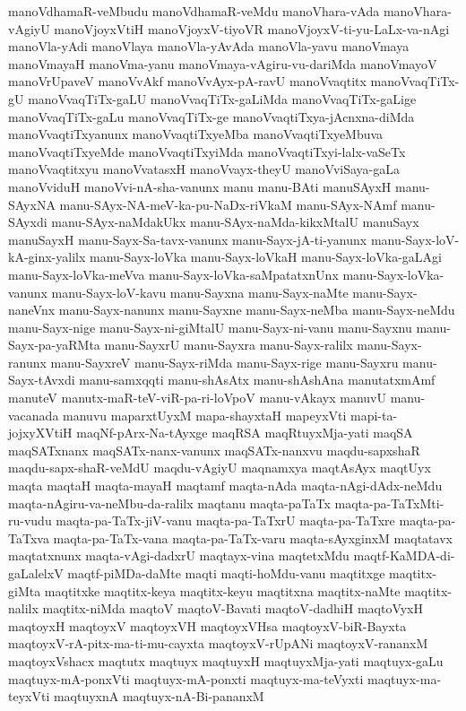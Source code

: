 {manoVdhamaR-veMbudu
manoVdhamaR-veMdu
manoVhara-vAda
manoVhara-vAgiyU
manoVjoyxVtiH
manoVjoyxV-tiyoVR
manoVjoyxV-ti-yu-LaLx-va-nAgi
manoVla-yAdi
manoVlaya
manoVla-yAvAda
manoVla-yavu
manoVmaya
manoVmayaH
manoVma-yanu
manoVmaya-vAgiru-vu-dariMda
manoVmayoV
manoVrUpaveV
manoVvAkf
manoVvAyx-pA-ravU
manoVvaqtitx
manoVvaqTiTx-gU
manoVvaqTiTx-gaLU
manoVvaqTiTx-gaLiMda
manoVvaqTiTx-gaLige
manoVvaqTiTx-gaLu
manoVvaqTiTx-ge
manoVvaqtiTxya-jAcnxna-diMda
manoVvaqtiTxyanunx
manoVvaqtiTxyeMba
manoVvaqtiTxyeMbuva
manoVvaqtiTxyeMde
manoVvaqtiTxyiMda
manoVvaqtiTxyi-lalx-vaSeTx
manoVvaqtitxyu
manoVvatasxH
manoVvayx-theyU
manoVviSaya-gaLa
manoVviduH
manoVvi-nA-sha-vanunx
manu
manu-BAti
manuSAyxH
manu-SAyxNA
manu-SAyx-NA-meV-ka-pu-NaDx-riVkaM
manu-SAyx-NAmf
manu-SAyxdi
manu-SAyx-naMdakUkx
manu-SAyx-naMda-kikxMtalU
manuSayx
manuSayxH
manu-Sayx-Sa-tavx-vanunx
manu-Sayx-jA-ti-yanunx
manu-Sayx-loV-kA-ginx-yalilx
manu-Sayx-loVka
manu-Sayx-loVkaH
manu-Sayx-loVka-gaLAgi
manu-Sayx-loVka-meVva
manu-Sayx-loVka-saMpatatxnUnx
manu-Sayx-loVka-vanunx
manu-Sayx-loV-kavu
manu-Sayxna
manu-Sayx-naMte
manu-Sayx-naneVnx
manu-Sayx-nanunx
manu-Sayxne
manu-Sayx-neMba
manu-Sayx-neMdu
manu-Sayx-nige
manu-Sayx-ni-giMtalU
manu-Sayx-ni-vanu
manu-Sayxnu
manu-Sayx-pa-yaRMta
manu-SayxrU
manu-Sayxra
manu-Sayx-ralilx
manu-Sayx-ranunx
manu-SayxreV
manu-Sayx-riMda
manu-Sayx-rige
manu-Sayxru
manu-Sayx-tAvxdi
manu-samxqqti
manu-shAsAtx
manu-shAshAna
manutatxmAmf
manuteV
manutx-maR-teV-viR-pa-ri-loVpoV
manu-vAkayx
manuvU
manu-vacanada
manuvu
maparxtUyxM
mapa-shayxtaH
mapeyxVti
mapi-ta-jojxyXVtiH
maqNf-pArx-Na-tAyxge
maqRSA
maqRtuyxMja-yati
maqSA
maqSATxnanx
maqSATx-nanx-vanunx
maqSATx-nanxvu
maqdu-sapxshaR
maqdu-sapx-shaR-veMdU
maqdu-vAgiyU
maqnamxya
maqtAsAyx
maqtUyx
maqta
maqtaH
maqta-mayaH
maqtamf
maqta-nAda
maqta-nAgi-dAdx-neMdu
maqta-nAgiru-va-neMbu-da-ralilx
maqtanu
maqta-paTaTx
maqta-pa-TaTxMti-ru-vudu
maqta-pa-TaTx-jiV-vanu
maqta-pa-TaTxrU
maqta-pa-TaTxre
maqta-pa-TaTxva
maqta-pa-TaTx-vana
maqta-pa-TaTx-varu
maqta-sAyxginxM
maqtatavx
maqtatxnunx
maqta-vAgi-dadxrU
maqtayx-vina
maqtetxMdu
maqtf-KaMDA-di-gaLalelxV
maqtf-piMDa-daMte
maqti
maqti-hoMdu-vanu
maqtitxge
maqtitx-giMta
maqtitxke
maqtitx-keya
maqtitx-keyu
maqtitxna
maqtitx-naMte
maqtitx-nalilx
maqtitx-niMda
maqtoV
maqtoV-Bavati
maqtoV-dadhiH
maqtoVyxH
maqtoyxH
maqtoyxV
maqtoyxVH
maqtoyxVHsa
maqtoyxV-biR-Bayxta
maqtoyxV-rA-pitx-ma-ti-mu-cayxta
maqtoyxV-rUpANi
maqtoyxV-rananxM
maqtoyxVshacx
maqtutx
maqtuyx
maqtuyxH
maqtuyxMja-yati
maqtuyx-gaLu
maqtuyx-mA-ponxVti
maqtuyx-mA-ponxti
maqtuyx-ma-teVyxti
maqtuyx-ma-teyxVti
maqtuyxnA
maqtuyx-nA-Bi-pananxM
}
